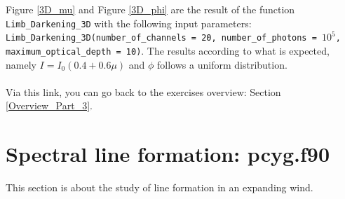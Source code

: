 \documentclass[../main/main.tex]{subfiles}
\begin{document}
Figure \ref{3D_mu} and Figure \ref{3D_phi}  are the result of 
the function \texttt{Limb\_Darkening\_3D} with the following input parameters: \texttt{Limb\_Darkening\_3D(number\_of\_channels = 20, number\_of\_photons = $10^5$, \\ maximum\_optical\_depth = 10)}. The results according to what is expected, namely $I = I_0(0.4+0.6\mu)$ and $\phi$ follows a uniform distribution.

\paragraph{}
\noindent{}

\vspace{0.4cm}
Via this link, you can go back to the exercises overview: Section \underline{\ref{Overview_Part_3}}.

\newpage
\section{Spectral line formation: pcyg.f90}
This section is about the study of line formation in an expanding wind.
\end{document}
